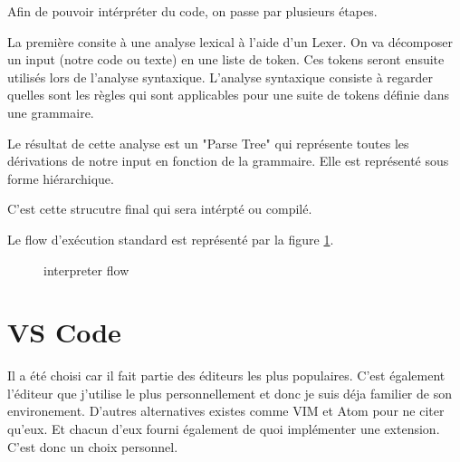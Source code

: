 \documentclass[
    iict, %
    il, %
]{heig-tb}
\begin{document}
Afin de pouvoir intérpréter du code, on passe par plusieurs étapes.

La première consite à une analyse lexical à l'aide d'un Lexer. On va décomposer un input (notre code ou texte) en une liste de token.
Ces tokens seront ensuite utilisés lors de l'analyse syntaxique. L'analyse syntaxique consiste à regarder quelles sont les règles qui sont applicables pour une suite de tokens définie dans une grammaire.

Le résultat de cette analyse est un "Parse Tree" qui représente toutes les dérivations de notre input en fonction de la grammaire.
Elle est représenté sous forme hiérarchique.

C'est cette strucutre final qui sera intérpté ou compilé.

Le flow d'exécution standard est représenté par la figure \ref{interpreter-flow}.

\begin{figure}[!h]
    \begin{center}
    \end{center}
    \caption[interpreter-flow Anatomy]{\label{interpreter-flow} interpreter flow}
\end{figure}


\section{VS Code}

Il a été choisi car il fait partie des éditeurs les plus populaires. C'est également l'éditeur que j'utilise le plus personnellement et donc je suis déja familier de son environement.
D'autres alternatives existes comme VIM et Atom pour ne citer qu'eux. Et chacun d'eux fourni également de quoi implémenter une extension.
C'est donc un choix personnel.
\end{document}
